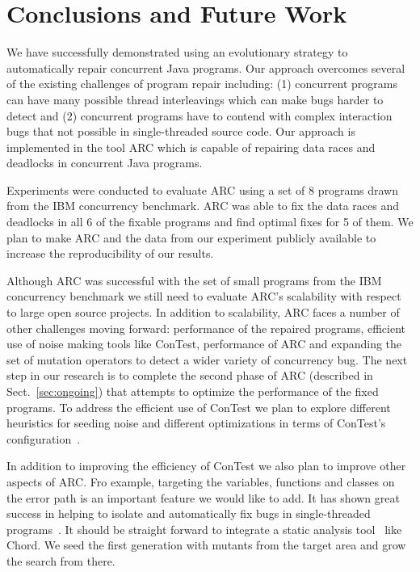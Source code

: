 \section{Conclusions and Future Work}
\label{sec:conclusion}


We have successfully demonstrated using an evolutionary strategy to automatically repair concurrent Java programs. Our approach overcomes several of the existing challenges of program repair including: (1) concurrent programs can have many possible thread interleavings which can make bugs harder to detect and (2) concurrent programs have to contend with complex interaction bugs that not possible in single-threaded source code. Our approach is implemented in the tool ARC which is capable of repairing data races and deadlocks in concurrent Java programs.

 Experiments were conducted to evaluate ARC using a set of 8 programs drawn from the IBM concurrency benchmark. ARC was able to fix the data races and deadlocks in all 6 of the fixable programs and find optimal fixes
for 5 of them. We plan to make ARC and the data from our experiment publicly available to increase the reproducibility of our results.

Although ARC was successful with the set of small programs from the IBM concurrency benchmark we still need to evaluate ARC's scalability with respect to large open source projects. In addition to scalability, ARC faces a number of other challenges moving forward:  performance of the repaired programs, efficient use of noise making tools like ConTest, performance of ARC and expanding the set of mutation operators to detect a wider variety of concurrency bug. The next step in our research is to complete the second phase of ARC (described in Sect.~\ref{sec:ongoing}) that attempts to 
optimize the performance of the fixed programs. To address the efficient use of ConTest we plan to explore different heuristics for seeding noise and different optimizations in terms of ConTest's configuration~\cite{KLVU10}.

In addition to improving the efficiency of ConTest we also plan to improve other aspects of ARC. Fro example, targeting the variables, functions and classes on the error path is an important feature  we would like to add. It has shown great success in helping to isolate and automatically fix bugs in single-threaded programs~\cite{FNWG09, WNLF09, NWLF09, WFGN10, GNFW11, LDFW12}. It should be straight forward to integrate a static analysis tool~\cite{HP04, NPSG09, NWLF09} like Chord.  We seed the first generation with mutants from the target area and grow the search from there.

